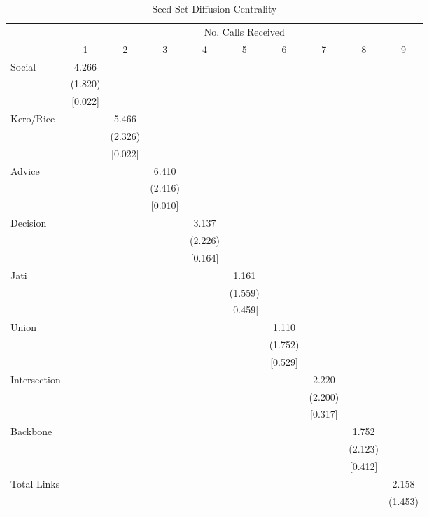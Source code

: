 \begin{table}
\centering
\caption{Seed Set Diffusion Centrality}
\centering
\begin{tabular}[t]{lccccccccc}
\toprule
\multicolumn{1}{c}{ } & \multicolumn{9}{c}{No. Calls Received} \\
\cmidrule(l{3pt}r{3pt}){2-10}
  & 1 & 2 & 3 & 4 & 5 & 6 & 7 & 8 & 9\\
\midrule
Social & \num{4.266} &  &  &  &  &  &  &  & \\
 & (\num{1.820}) &  &  &  &  &  &  &  & \\
 & {}[\num{0.022}] &  &  &  &  &  &  &  & \\
Kero/Rice &  & \num{5.466} &  &  &  &  &  &  & \\
 &  & (\num{2.326}) &  &  &  &  &  &  & \\
 &  & {}[\num{0.022}] &  &  &  &  &  &  & \\
Advice &  &  & \num{6.410} &  &  &  &  &  & \\
 &  &  & (\num{2.416}) &  &  &  &  &  & \\
 &  &  & {}[\num{0.010}] &  &  &  &  &  & \\
Decision &  &  &  & \num{3.137} &  &  &  &  & \\
 &  &  &  & (\num{2.226}) &  &  &  &  & \\
 &  &  &  & {}[\num{0.164}] &  &  &  &  & \\
Jati &  &  &  &  & \num{1.161} &  &  &  & \\
 &  &  &  &  & (\num{1.559}) &  &  &  & \\
 &  &  &  &  & {}[\num{0.459}] &  &  &  & \\
Union &  &  &  &  &  & \num{1.110} &  &  & \\
 &  &  &  &  &  & (\num{1.752}) &  &  & \\
 &  &  &  &  &  & {}[\num{0.529}] &  &  & \\
Intersection &  &  &  &  &  &  & \num{2.220} &  & \\
 &  &  &  &  &  &  & (\num{2.200}) &  & \\
 &  &  &  &  &  &  & {}[\num{0.317}] &  & \\
Backbone &  &  &  &  &  &  &  & \num{1.752} & \\
 &  &  &  &  &  &  &  & (\num{2.123}) & \\
 &  &  &  &  &  &  &  & {}[\num{0.412}] & \\
Total Links &  &  &  &  &  &  &  &  & \num{2.158}\\
 &  &  &  &  &  &  &  &  & (\num{1.453})\\

\end{tabular}
\end{table}
